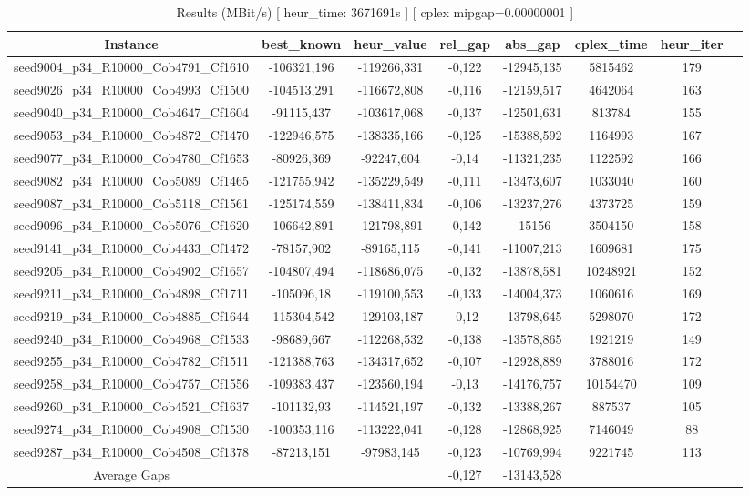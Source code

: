 \documentclass[a4paper]{article}
\begin{document}
\begin{center}
\begin{longtable}{cccccccc}
\caption{Results (MBit/s) [ heur\_time: 3671691s ]  [ cplex mipgap=0.00000001 ]}
\tabularnewline
\hline
Instance & best\_known & heur\_value & rel\_gap & abs\_gap & cplex\_time & heur\_iter\\
\hline
seed9004\_p34\_R10000\_Cob4791\_Cf1610 & -106321,196 & -119266,331 & -0,122 & -12945,135 & 5815462 & 179\\
\hline
seed9026\_p34\_R10000\_Cob4993\_Cf1500 & -104513,291 & -116672,808 & -0,116 & -12159,517 & 4642064 & 163\\
\hline
seed9040\_p34\_R10000\_Cob4647\_Cf1604 & -91115,437 & -103617,068 & -0,137 & -12501,631 & 813784 & 155\\
\hline
seed9053\_p34\_R10000\_Cob4872\_Cf1470 & -122946,575 & -138335,166 & -0,125 & -15388,592 & 1164993 & 167\\
\hline
seed9077\_p34\_R10000\_Cob4780\_Cf1653 & -80926,369 & -92247,604 & -0,14 & -11321,235 & 1122592 & 166\\
\hline
seed9082\_p34\_R10000\_Cob5089\_Cf1465 & -121755,942 & -135229,549 & -0,111 & -13473,607 & 1033040 & 160\\
\hline
seed9087\_p34\_R10000\_Cob5118\_Cf1561 & -125174,559 & -138411,834 & -0,106 & -13237,276 & 4373725 & 159\\
\hline
seed9096\_p34\_R10000\_Cob5076\_Cf1620 & -106642,891 & -121798,891 & -0,142 & -15156 & 3504150 & 158\\
\hline
seed9141\_p34\_R10000\_Cob4433\_Cf1472 & -78157,902 & -89165,115 & -0,141 & -11007,213 & 1609681 & 175\\
\hline
seed9205\_p34\_R10000\_Cob4902\_Cf1657 & -104807,494 & -118686,075 & -0,132 & -13878,581 & 10248921 & 152\\
\hline
seed9211\_p34\_R10000\_Cob4898\_Cf1711 & -105096,18 & -119100,553 & -0,133 & -14004,373 & 1060616 & 169\\
\hline
seed9219\_p34\_R10000\_Cob4885\_Cf1644 & -115304,542 & -129103,187 & -0,12 & -13798,645 & 5298070 & 172\\
\hline
seed9240\_p34\_R10000\_Cob4968\_Cf1533 & -98689,667 & -112268,532 & -0,138 & -13578,865 & 1921219 & 149\\
\hline
seed9255\_p34\_R10000\_Cob4782\_Cf1511 & -121388,763 & -134317,652 & -0,107 & -12928,889 & 3788016 & 172\\
\hline
seed9258\_p34\_R10000\_Cob4757\_Cf1556 & -109383,437 & -123560,194 & -0,13 & -14176,757 & 10154470 & 109\\
\hline
seed9260\_p34\_R10000\_Cob4521\_Cf1637 & -101132,93 & -114521,197 & -0,132 & -13388,267 & 887537 & 105\\
\hline
seed9274\_p34\_R10000\_Cob4908\_Cf1530 & -100353,116 & -113222,041 & -0,128 & -12868,925 & 7146049 & 88\\
\hline
seed9287\_p34\_R10000\_Cob4508\_Cf1378 & -87213,151 & -97983,145 & -0,123 & -10769,994 & 9221745 & 113\\
\hline
\hline
Average Gaps & & & -0,127 & -13143,528 & & \\
\hline
\hline
\end{longtable}
\end{center}
\end{document}
